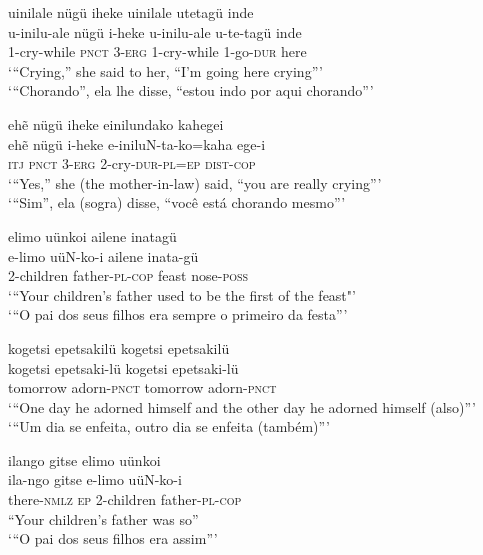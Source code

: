 \documentclass[output=paper,
modfonts,nonflat
]{langsci/langscibook}
\begin{document}
\ea uinilale nügü iheke uinilale utetagü inde\\[.3em]
\gll u-inilu-ale	nügü	i-heke	u-inilu-ale	u-te-tagü	inde\\
1-cry-while 	\textsc{pnct}	3-\textsc{erg}	1-cry-while 	1-go-\textsc{dur}	here\\
\glt ‘“Crying,” she said to her, “I’m going here crying”’\\
‘“Chorando”, ela lhe disse, “estou indo por aqui chorando”’\\
\z

\largerpage
\ea ehẽ nügü iheke einilundako kahegei\\[.3em]
\gll ehẽ	nügü	i-heke	e-iniluN-ta-ko=kaha	ege-i\\
\textsc{itj} 	\textsc{pnct}	3-\textsc{erg}	2-cry-\textsc{dur}-\textsc{pl}=\textsc{ep}	\textsc{dist-cop} \\
\glt ‘“Yes,” she (the mother-in-law) said, “you are really crying”’\\
‘“Sim”, ela (sogra) disse, “você está chorando mesmo”’\\
\z

\ea elimo uünkoi ailene inatagü{\footnotemark} \\[.3em]
\gll e-limo		uüN-ko-i	ailene	inata-gü \\
2-children	father-\textsc{pl-cop}	feast	nose-\textsc{poss} \\
\glt ‘“Your children’s father used to be the first of the feast"' \\
‘“O pai dos seus filhos era sempre o primeiro da festa”’\\
\z

\ea kogetsi epetsakilü kogetsi epetsakilü\\[.3em]
\gll kogetsi		epetsaki-lü	kogetsi		epetsaki-lü\\
tomorrow	adorn-\textsc{pnct}	tomorrow 	adorn-\textsc{pnct}\\
\glt ‘“One day he adorned himself and the other day he adorned himself (also)”’\\
‘“Um dia se enfeita, outro dia se enfeita (também)”’\\
\z

\ea ilango gitse elimo uünkoi\\[.3em]
\gll ila-ngo		gitse	e-limo		uüN-ko-i\\
there-\textsc{nmlz}	\textsc{ep}	2-children	father-\textsc{pl}-\textsc{cop} \\
\glt “Your children’s father was so”\\
‘“O pai dos seus filhos era assim”’\\
\z
\end{document}
